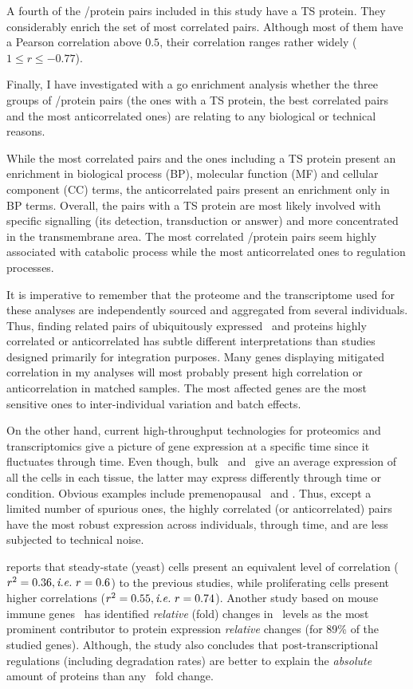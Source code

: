 A fourth of the \mRNA/protein pairs included in this study have a \gls{TS} protein.
They considerably enrich the set of most correlated pairs.
Although most of them have a Pearson correlation above $0.5$,
their correlation ranges rather widely ($1 ≤ r≤ -0.77$).

Finally, I have investigated with a \gls{go} enrichment analysis
whether the three groups of \mRNA/protein pairs
(the ones with a \gls{TS} protein, the best correlated pairs
and the most anticorrelated ones) are relating to
any biological or technical reasons.

While the most correlated pairs and the ones including a \gls{TS} protein
present an enrichment in biological process (BP),
molecular function (MF) and cellular component (CC) terms,
the anticorrelated pairs present an enrichment only in BP terms.
Overall, the pairs with a \gls{TS} protein are most likely involved
with specific signalling (its detection, transduction or answer)
and more concentrated in the transmembrane area.
The most correlated \mRNA/protein pairs seem highly associated
with catabolic process
while the most anticorrelated ones to regulation processes.

It is imperative to remember that the proteome and the transcriptome used
for these analyses are independently sourced and aggregated from several individuals.
Thus, finding related pairs of ubiquitously expressed \mRNAs\ and proteins
highly correlated or anticorrelated has subtle different interpretations
than studies designed primarily for integration purposes.
Many genes displaying mitigated correlation in my analyses will most probably
present high correlation or anticorrelation in matched samples.
The most affected genes are the most sensitive ones
to inter-individual variation and batch effects.

On the other hand,
current high-throughput technologies
for proteomics and transcriptomics give a picture of gene expression
at a specific time
since it fluctuates through time.
Even though, bulk \Rnaseq\ and \ms\ give an average expression
of all the cells in each tissue,
the latter may express differently through time or condition.
Obvious examples include premenopausal \Ovary\ and \Uterus.
Thus, except a limited number of spurious ones,
the highly correlated (or anticorrelated) pairs have
the most robust expression across individuals, through time,
and are less subjected to technical noise.


\citet{Marguerat2012-sn} reports that
steady-state (yeast) cells present an equivalent level of correlation
($r^2=0.36, \textit{i.e.}~r=0.6$) to the previous studies,
while proliferating cells present higher correlations ($r^2=0.55, \textit{i.e.}~r=0.74$).
Another study based on mouse immune genes~ has identified
\emph{relative} (fold) changes in \mRNAs\ levels
as the most prominent contributor to protein expression \emph{relative} changes
(for 89\% of the studied genes).
Although, the study also concludes that
post-transcriptional regulations (including degradation rates)
are better to explain the \emph{absolute} amount of proteins than
any \mRNA\ fold change.\mybr\


